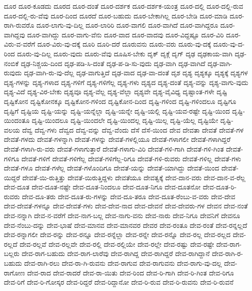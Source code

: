 {ದೂರ
ದೂರ-ಕೂಡದು
ದೂರದ
ದೂರ-ದಂತೆ
ದೂರ-ದರ್ಶಕ
ದೂರ-ದರ್ಶಕ-ಯಂತ್ರ
ದೂರ-ದಲ್ಲಿ
ದೂರ-ದಲ್ಲಿ-ರುವ
ದೂರ-ದಲ್ಲಿ-ರು-ವೆವು
ದೂರ-ದಿಂದ
ದೂರದೆ
ದೂರ-ಬಹುದು
ದೂರ-ಬೇಕಾಗಿಲ್ಲ
ದೂರ-ಬೇಡಿ
ದೂರ-ಮಾಡಿ
ದೂರ-ರಾಗಿ-ರುವರೊ
ದೂರ-ಲಾಗು-ವು-ದಿಲ್ಲ
ದೂರ-ಲಾರಿರಿ
ದೂರ-ವಾಗಲಿ
ದೂರ-ವಾಗಿದೆ
ದೂರ-ವಾಗಿದ್ದರೂ
ದೂರ-ವಾಗಿದ್ದವು
ದೂರ-ವಾಗಿದ್ದು
ದೂರ-ವಾಗು-ವೆನು
ದೂರ-ವಾದ
ದೂರ-ವಾದವು
ದೂರ-ವಿದ್ದಷ್ಟೂ
ದೂರ-ವಿರಿ
ದೂರ-ವಿರು-ವ-ವರೆಗೆ
ದೂರ-ವಿರು-ವು-ದಕ್ಕೆ
ದೂರಿ
ದೂರಿ-ದರೆ
ದೂರುವನು
ದೂರು-ವರು
ದೂರು-ವು-ದಕ್ಕೆ
ದೂರು-ವು-ದ-ರಿಂದ
ದೂರು-ವು-ದಿಲ್ಲ
ದೂರು-ವುದು
ದೂರು-ವೆವು
ದೂಷಿಸ-ಬೇಕು
ದೃಕ್
ದೃಕ್ಗೆ
ದೃಗ್
ದೃಢ
ದೃಢಕಾಯ-ವಾಗಿ
ದೃಢ-ನಂಬಿಕೆ
ದೃಢ-ನಿಶ್ಚಯ-ದಿಂದ
ದೃಢ-ಪಡಿ-ಸಿ-ದಂತೆ
ದೃಢ-ಪ-ಡಿ-ಸು-ವುದು
ದೃಢ-ವಾಗಿ
ದೃಢ-ವಾಗಿದೆ
ದೃಢ-ವಾಗಿ-ರುವುದು
ದೃಢ-ವಾಗಿ-ರು-ವು-ದೆಲ್ಲ
ದೃಢ-ವಾಗುತ್ತಿದೆ
ದೃಢ-ವಾದ
ದೃಢ-ವಾ-ದಂತೆ
ದೃಶ
ದೃಶ್ಯ
ದೃಶ್ಯಕ್ಕೂ
ದೃಶ್ಯಕ್ಕೆ
ದೃಶ್ಯಗಳ
ದೃಶ್ಯ-ಗಳನ್ನು
ದೃಶ್ಯ-ಗಳಾದ
ದೃಶ್ಯ-ಗಳಿಗೆ
ದೃಶ್ಯ-ಗಳಿಗೆಲ್ಲ
ದೃಶ್ಯ-ಗಳು
ದೃಶ್ಯದ
ದೃಶ್ಯ-ದಂತೆ
ದೃಶ್ಯ-ವನ್ನು
ದೃಶ್ಯ-ವಾಗು-ವುದು
ದೃಶ್ಯ-ವಿದೆ
ದೃಶ್ಯ-ವಿರ-ಬೇಕು
ದೃಶ್ಯವೂ
ದೃಶ್ಯ-ವೆಲ್ಲ
ದೃಶ್ಯ-ವೆಲ್ಲಾ
ದೃಶ್ಯವೇ
ದೃಶ್ಯ-ವೈವಿಧ್ಯ
ದೃಷ್ಟಾಂತ-ಗಳೇ
ದೃಷ್ಟಿ
ದೃಷ್ಟಿಕೋನ
ದೃಷ್ಟಿಕೋನಕ್ಕೂ
ದೃಷ್ಟಿಕೋನ-ಗಳಿಂದ
ದೃಷ್ಟಿಕೋನ-ದಿಂದ
ದೃಷ್ಟಿ-ಗಳಿಂದ
ದೃಷ್ಟಿ-ಗಳಿಂದಲೂ
ದೃಷ್ಟಿಗೂ
ದೃಷ್ಟಿಗೆ
ದೃಷ್ಟಿಯ
ದೃಷ್ಟಿ-ಯನ್ನು
ದೃಷ್ಟಿ-ಯನ್ನೆಲ್ಲಾ
ದೃಷ್ಟಿ-ಯನ್ನೇ
ದೃಷ್ಟಿ-ಯಲ್ಲಿ
ದೃಷ್ಟಿ-ಯವ-ರಷ್ಟೇ
ದೃಷ್ಟಿ-ಯಿಂದ
ದೃಷ್ಟಿ-ಯಿಂದಂತೂ
ದೃಷ್ಟಿ-ಯಿಂದಲೂ
ದೃಷ್ಟಿ-ಯಿಂದಲೇ
ದೃಷ್ಟಿ-ಯಿಂದಲ್ಲ
ದೃಷ್ಟಿ-ಯಿಲ್ಲ
ದೃಷ್ಟಿ-ಯೆಲ್ಲ
ದೃಷ್ಟಿಯೇ
ದೃಷ್ಟಿ-ವಲಯ
ದೆವ್ವ
ದೆವ್ವ-ಗಳು
ದೆವ್ವದ
ದೆವ್ವ-ವನ್ನು
ದೆವ್ವ-ವೆಂದು
ದೆಸೆ
ದೆಸೆ-ಯಿಂದ
ದೇವ
ದೇವತಾ
ದೇವತೆ
ದೇವತೆ-ಗಳ
ದೇವತೆ-ಗಳದು
ದೇವತೆ-ಗಳನ್ನಾಗಿ
ದೇವತೆ-ಗಳನ್ನು
ದೇವತೆ-ಗಳಲ್ಲಿಯೂ
ದೇವತೆ-ಗಳಾಗಲೀ
ದೇವತೆ-ಗಳಾಗಿದ್ದರೆ
ದೇವತೆ-ಗಳಾಗಿ-ರು-ವರು
ದೇವತೆ-ಗಳಾಗುತ್ತಾರೆ
ದೇವತೆ-ಗಳಾಗು-ವಿರಿ
ದೇವತೆ-ಗಳಿ-ಗಾಗಿ
ದೇವತೆ-ಗಳಿ-ಗಿಂತ
ದೇವತೆ-ಗಳಿಗೂ
ದೇವತೆ-ಗಳಿಗೆ
ದೇವತೆ-ಗಳಿಗೆಲ್ಲ
ದೇವತೆ-ಗಳಿಗೆಲ್ಲ-ರಿಗೂ
ದೇವತೆ-ಗಳಿ-ರುವರು
ದೇವತೆ-ಗಳಿಲ್ಲ
ದೇವತೆ-ಗಳು
ದೇವತೆ-ಗಳೂ
ದೇವತೆ-ಗಳೆಲ್ಲ
ದೇವತೆ-ಗಳೊಂದಿಗೂ
ದೇವತೆ-ಯನ್ನು
ದೇವತೆ-ಯಾಗಿದ್ದು
ದೇವತೆ-ಯಿಂದ
ದೇವತೆ-ಯಿದ್ದರೆ
ದೇವತೆ-ಯಿ-ರುತ್ತಿತ್ತು
ದೇವತೆ-ಯಿರುತ್ತಿದ್ದಳು
ದೇವತೆಯೂ
ದೇವತ್ವಕ್ಕೆ
ದೇವ-ದಾನ-ವರು
ದೇವ-ದಾನ-ವ-ರೆಲ್ಲ
ದೇವ-ದೂತ
ದೇವ-ದೂತ-ನಷ್ಟೇ
ದೇವ-ದೂತ-ನಿಂದಲೂ
ದೇವ-ದೂತ-ನಿಗೂ
ದೇವ-ದೂತನೋ
ದೇವ-ದೂತ-ರಿ-ರುವರು
ದೇವ-ದೂ-ತರು
ದೇವ-ದೂತ-ರು-ಗಳನ್ನು
ದೇವ-ದೂ-ತರೂ
ದೇವ-ದೂತ-ರೆಂಬು-ವ-ವರು
ದೇವ-ದೇವ
ದೇವ-ದೇವತೆ-ಗಳನ್ನೂ
ದೇವ-ದೇವತೆ-ಗಳು
ದೇವ-ದೇವ-ನಾದ
ದೇವ-ದೇವನೆ
ದೇವ-ದೇವರು-ಗಳ
ದೇವನ
ದೇವ-ನಂತೆ
ದೇವ-ನನ್ನಾಗಿ
ದೇವ-ನ-ವರೆಗೆ
ದೇವ-ನಾಗ-ಬಲ್ಲ
ದೇವ-ನಾಗು-ವನು
ದೇವ-ನಾರು
ದೇವ-ನಿಗೂ
ದೇವನಿಗೆ
ದೇವನೂ
ದೇವ-ನೆಂಬು-ದನ್ನು
ದೇವ-ಭಾಷೆ
ದೇವ-ಮಾನವ
ದೇವ-ಮಾನವರ
ದೇವರ
ದೇವ-ರಂತೂ
ದೇವ-ರಂತೆ
ದೇವ-ರನ್ನಲ್ಲದೆ
ದೇವ-ರನ್ನಾಗಲೀ
ದೇವ-ರನ್ನು
ದೇವ-ರನ್ನೂ
ದೇವ-ರನ್ನೆಲ್ಲಾ
ದೇವ-ರನ್ನೇ
ದೇವ-ರನ್ನೊ
ದೇವ-ರಲ್ಲ
ದೇವ-ರಲ್ಲದ
ದೇವ-ರಲ್ಲದೆ
ದೇವ-ರಲ್ಲವೆ
ದೇವ-ರಲ್ಲವೇ
ದೇವ-ರಲ್ಲಿ
ದೇವ-ರಲ್ಲಿಯೇ
ದೇವ-ರಲ್ಲೇ
ದೇವ-ರಷ್ಟು
ದೇವ-ರಷ್ಟೇ
ದೇವ-ರಾಗ-ಬಲ್ಲರು
ದೇವ-ರಾಗ-ಬಹುದು
ದೇವ-ರಾಗ-ಲಾರೆವು
ದೇವ-ರಾಗಿದ್ದ
ದೇವ-ರಾಗಿದ್ದರೆ
ದೇವ-ರಾಗಿದ್ದಾನೆ
ದೇವ-ರಾಗಿ-ರ-ಬಹುದು
ದೇವ-ರಾಗಿ-ರಲು
ದೇವ-ರಾ-ಗಿ-ರುವನು
ದೇವ-ರಾಗುವ
ದೇವ-ರಾಗುವನು
ದೇವ-ರಾಗು-ವು-ದಲ್ಲ
ದೇವ-ರಾಗೋಣ
ದೇವ-ರಾದ
ದೇವ-ರಾದರೆ
ದೇವ-ರಾ-ಯಿತು
ದೇವ-ರಿಂದ
ದೇವ-ರಿ-ಗಾಗಿ
ದೇವ-ರಿ-ಗಿಂತ
ದೇವ-ರಿಗೂ
ದೇವ-ರಿಗೆ
ದೇವ-ರಿ-ಗೋಸ್ಕರ
ದೇವ-ರಿದ್ದರೆ
ದೇವ-ರಿದ್ದಾನೋ
ದೇವ-ರಿ-ರುವ
ದೇವ-ರಿ-ರುವನು
ದೇವ-ರಿ-ರುವನೆ
}

